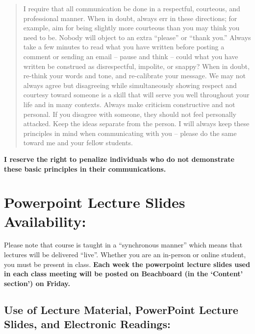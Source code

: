 \documentclass[11pt,]{article}
\begin{document}
\begin{itemize}
  \begin{quote}
  I require that all communication be done in a respectful, courteous,
  and professional manner. When in doubt, always err in these
  directions; for example, aim for being slightly more courteous than
  you may think you need to be. Nobody will object to an extra
  ``please'' or ``thank you.'' Always take a few minutes to read what
  you have written before posting a comment or sending an email -- pause
  and think -- could what you have written be construed as
  disrespectful, impolite, or snappy? When in doubt, re-think your words
  and tone, and re-calibrate your message. We may not always agree but
  disagreeing while simultaneously showing respect and courtesy toward
  someone is a skill that will serve you well throughout your life and
  in many contexts. Always make criticism constructive and not personal.
  If you disagree with someone, they should not feel personally
  attacked. Keep the ideas separate from the person. I will always keep
  these principles in mind when communicating with you -- please do the
  same toward me and your fellow students.
  \end{quote}
\end{itemize}

\textbf{I reserve the right to penalize individuals who do not
demonstrate these basic principles in their communications.}

\hypertarget{powerpoint-lecture-slides-availability}{%
\section{Powerpoint Lecture Slides
Availability:}\label{powerpoint-lecture-slides-availability}}

Please note that course is taught in a ``synchronous manner'' which
means that lectures will be delivered ``live''. Whether you are an
in-person or online student, you must be present in class. \textbf{Each
week the powerpoint lecture slides used in each class meeting will be
posted on Beachboard (in the `Content' section') on Friday.}

\hypertarget{use-of-lecture-material-powerpoint-lecture-slides-and-electronic-readings}{%
\subsection{Use of Lecture Material, PowerPoint Lecture Slides, and
Electronic
Readings:}\label{use-of-lecture-material-powerpoint-lecture-slides-and-electronic-readings}}
\end{document}
